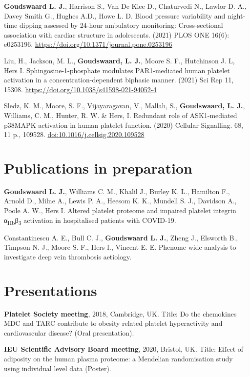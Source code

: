 \documentclass[11pt,twoside]{bristolthesis}
\begin{document}
\textbf{Goudswaard L. J.}, Harrison S., Van De Klee D., Chaturvedi N., Lawlor D. A., Davey Smith G., Hughes A.D., Howe L. D. Blood pressure variability and night-time dipping assessed by 24-hour ambulatory monitoring: Cross-sectional association with cardiac structure in adolescents. (2021) PLOS ONE 16(6): e0253196. \url{https://doi.org/10.1371/journal.pone.0253196}

Liu, H., Jackson, M. L., \textbf{Goudswaard, L. J.}, Moore S. F., Hutchinson J. L, Hers I. Sphingosine-1-phosphate modulates PAR1-mediated human platelet activation in a concentration-dependent biphasic manner. (2021) Sci Rep 11, 15308. \url{https://doi.org/10.1038/s41598-021-94052-4}

Sledz, K. M., Moore, S. F., Vijayaragavan, V., Mallah, S., \textbf{Goudswaard, L. J.}, Williams, C. M., Hunter, R. W. \& Hers, I. Redundant role of ASK1-mediated p38MAPK activation in human platelet function. (2020) Cellular Signalling. 68, 11 p., 109528. \url{doi:10.1016/j.cellsig.2020.109528}

\hypertarget{publications-in-preparation}{%
\section{Publications in preparation}\label{publications-in-preparation}}

\textbf{Goudswaard L. J.}, Williams C. M., Khalil J., Burley K. L., Hamilton F., Arnold D., Milne A., Lewis P. A., Heesom K. K., Mundell S. J., Davidson A., Poole A. W., Hers I. Altered platelet proteome and impaired platelet integrin α\textsubscript{IIb}β\textsubscript{3} activation in hospitalised patients with COVID-19.

Constantinescu A. E., Bull C. J., \textbf{Goudswaard L. J.}, Zheng J., Elsworth B., Timpson N. J., Moore S. F., Hers I., Vincent E. E. Phenome-wide analysis to investigate deep vein thrombosis aetiology.

\hypertarget{presentations}{%
\section{Presentations}\label{presentations}}

\textbf{Platelet Society meeting}, 2018, Cambridge, UK. Title: Do the chemokines MDC and TARC contribute to obesity related platelet hyperactivity and cardiovascular disease? (Oral presentation).

\textbf{IEU Scientific Advisory Board meeting}, 2020, Bristol, UK. Title: Effect of adiposity on the human plasma proteome: a Mendelian randomisation study using individual level data (Poster).
\end{document}
